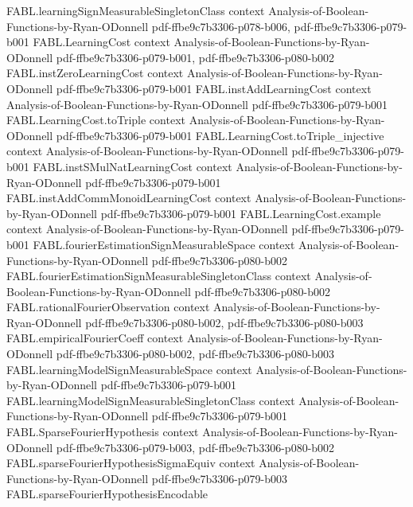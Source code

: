 \begin{theorem}
  {FABL.learningSignMeasurableSingletonClass}
  {context}
  {Analysis-of-Boolean-Functions-by-Ryan-ODonnell}
  {pdf-ffbe9c7b3306-p078-b006,
    pdf-ffbe9c7b3306-p079-b001}
\proofstep
  {FABL.LearningCost}
  {context}
  {Analysis-of-Boolean-Functions-by-Ryan-ODonnell}
  {pdf-ffbe9c7b3306-p079-b001,
    pdf-ffbe9c7b3306-p080-b002}
\proofstep
  {FABL.instZeroLearningCost}
  {context}
  {Analysis-of-Boolean-Functions-by-Ryan-ODonnell}
  {pdf-ffbe9c7b3306-p079-b001}
\proofstep
  {FABL.instAddLearningCost}
  {context}
  {Analysis-of-Boolean-Functions-by-Ryan-ODonnell}
  {pdf-ffbe9c7b3306-p079-b001}
\proofstep
  {FABL.LearningCost.toTriple}
  {context}
  {Analysis-of-Boolean-Functions-by-Ryan-ODonnell}
  {pdf-ffbe9c7b3306-p079-b001}
\proofstep
  {FABL.LearningCost.toTriple_injective}
  {context}
  {Analysis-of-Boolean-Functions-by-Ryan-ODonnell}
  {pdf-ffbe9c7b3306-p079-b001}
\proofstep
  {FABL.instSMulNatLearningCost}
  {context}
  {Analysis-of-Boolean-Functions-by-Ryan-ODonnell}
  {pdf-ffbe9c7b3306-p079-b001}
\proofstep
  {FABL.instAddCommMonoidLearningCost}
  {context}
  {Analysis-of-Boolean-Functions-by-Ryan-ODonnell}
  {pdf-ffbe9c7b3306-p079-b001}
\proofstep
  {FABL.LearningCost.example}
  {context}
  {Analysis-of-Boolean-Functions-by-Ryan-ODonnell}
  {pdf-ffbe9c7b3306-p079-b001}
\proofstep
  {FABL.fourierEstimationSignMeasurableSpace}
  {context}
  {Analysis-of-Boolean-Functions-by-Ryan-ODonnell}
  {pdf-ffbe9c7b3306-p080-b002}
\proofstep
  {FABL.fourierEstimationSignMeasurableSingletonClass}
  {context}
  {Analysis-of-Boolean-Functions-by-Ryan-ODonnell}
  {pdf-ffbe9c7b3306-p080-b002}
\proofstep
  {FABL.rationalFourierObservation}
  {context}
  {Analysis-of-Boolean-Functions-by-Ryan-ODonnell}
  {pdf-ffbe9c7b3306-p080-b002,
    pdf-ffbe9c7b3306-p080-b003}
\proofstep
  {FABL.empiricalFourierCoeff}
  {context}
  {Analysis-of-Boolean-Functions-by-Ryan-ODonnell}
  {pdf-ffbe9c7b3306-p080-b002,
    pdf-ffbe9c7b3306-p080-b003}
\proofstep
  {FABL.learningModelSignMeasurableSpace}
  {context}
  {Analysis-of-Boolean-Functions-by-Ryan-ODonnell}
  {pdf-ffbe9c7b3306-p079-b001}
\proofstep
  {FABL.learningModelSignMeasurableSingletonClass}
  {context}
  {Analysis-of-Boolean-Functions-by-Ryan-ODonnell}
  {pdf-ffbe9c7b3306-p079-b001}
\proofstep
  {FABL.SparseFourierHypothesis}
  {context}
  {Analysis-of-Boolean-Functions-by-Ryan-ODonnell}
  {pdf-ffbe9c7b3306-p079-b003,
    pdf-ffbe9c7b3306-p080-b002}
\proofstep
  {FABL.sparseFourierHypothesisSigmaEquiv}
  {context}
  {Analysis-of-Boolean-Functions-by-Ryan-ODonnell}
  {pdf-ffbe9c7b3306-p079-b003}
\proofstep
  {FABL.sparseFourierHypothesisEncodable}

\end{theorem}
